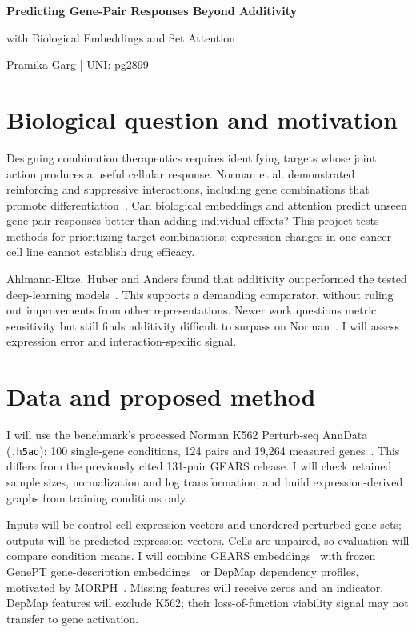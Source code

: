 \documentclass[11pt,letterpaper]{article}
\begin{document}
\fontsize{10.5pt}{12.6pt}\selectfont
\setlength{\abovedisplayskip}{5pt}
\setlength{\belowdisplayskip}{5pt}
\setlength{\abovedisplayshortskip}{3pt}
\setlength{\belowdisplayshortskip}{3pt}
\begin{center}
{\large\bfseries Predicting Gene-Pair Responses Beyond Additivity\par
with Biological Embeddings and Set Attention\par}
\vspace{4pt}
Pramika Garg \quad | \quad UNI: pg2899
\end{center}
\vspace{-5pt}

\section{Biological question and motivation}

Designing combination therapeutics requires identifying targets whose joint action produces a useful cellular response. Norman et al. demonstrated reinforcing and suppressive interactions, including gene combinations that promote differentiation~\cite{norman2019}. Can biological embeddings and attention predict unseen gene-pair responses better than adding individual effects? This project tests methods for prioritizing target combinations; expression changes in one cancer cell line cannot establish drug efficacy.

Ahlmann-Eltze, Huber and Anders found that additivity outperformed the tested deep-learning models~\cite{ahlmann2025}. This supports a demanding comparator, without ruling out improvements from other representations. Newer work questions metric sensitivity but still finds additivity difficult to surpass on Norman~\cite{miller2026}. I will assess expression error and interaction-specific signal.

\section{Data and proposed method}

I will use the benchmark's processed Norman K562 Perturb-seq AnnData (\texttt{.h5ad}): 100 single-gene conditions, 124 pairs and 19,264 measured genes~\cite{ahlmann2025}. This differs from the previously cited 131-pair GEARS release. I will check retained sample sizes, normalization and log transformation, and build expression-derived graphs from training conditions only.

Inputs will be control-cell expression vectors and unordered perturbed-gene sets; outputs will be predicted expression vectors. Cells are unpaired, so evaluation will compare condition means. I will combine GEARS embeddings~\cite{roohani2024} with frozen GenePT gene-description embeddings~\cite{chen2025} or DepMap dependency profiles, motivated by MORPH~\cite{he2025}. Missing features will receive zeros and an indicator. DepMap features will exclude K562; their loss-of-function viability signal may not transfer to gene activation.
\end{document}

